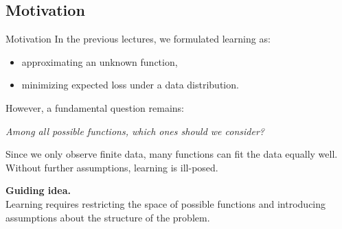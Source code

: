 \documentclass[aspectratio=169,11pt]{beamer}
\begin{document}
\subsection{Motivation}
\begin{frame}[t,allowframebreaks]{Motivation}
\small
In the previous lectures, we formulated learning as:
\begin{itemize}
    \item approximating an unknown function,
    \item minimizing expected loss under a data distribution.
\end{itemize}

However, a fundamental question remains:

\textit{Among all possible functions, which ones should we consider?}

Since we only observe finite data, many functions can fit the data equally well. Without further assumptions, learning is ill-posed.

\textbf{Guiding idea.}\\ Learning requires restricting the space of possible functions and introducing assumptions about the structure of the problem.
\end{frame}
\end{document}
